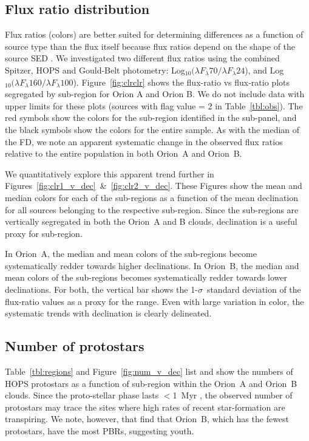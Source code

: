 \documentclass[manuscript]{aastex61}
\newcommand{\clra}{Log$_{10}(\lambda F_\lambda70/\lambda F_\lambda24$)}
\newcommand{\clrb}{Log$_{10}(\lambda F_\lambda160/\lambda F_\lambda100$)}
\begin{document}
\subsection{Flux ratio distribution}
\label{sec:fratio}
\par
Flux ratios (colors) are better suited for determining differences as a function of source type than the flux itself because flux ratios depend on the shape of the source SED \citep{ali}. We investigated two different flux ratios using the combined Spitzer, HOPS and Gould-Belt photometry: \clra, and \clrb. Figure~\ref{fig:clrclr} shows the flux-ratio vs flux-ratio plots segregated by sub-region for Orion A and Orion B. We do not include data with upper limits for these plots (sources with flag value = 2 in Table~\ref{tbl:obs}). The red symbols show the colors for the sub-region identified in the sub-panel, and the black symbols show the colors for the entire sample. As with the median of the FD, we note an apparent systematic change in the observed flux ratios relative to the entire population in both Orion~A and Orion~B.
\par
We quantitatively explore this apparent trend further in Figures~\ref{fig:clr1_v_dec}~\&~\ref{fig:clr2_v_dec}. These Figures show the mean and median colors for each of the sub-regions as a function of the mean declination for all sources belonging to the respective sub-region.  Since the sub-regions are vertically segregated in both the Orion~A and B clouds, declination is a useful proxy for sub-region.
\par
In Orion~A, the median and mean colors of the sub-regions become systematically redder towards higher declinations.  In Orion~B, the median and mean colors of the sub-regions becomes systematically redder towards lower declinations.  For both, the vertical bar shows the 1-$\sigma$\ standard deviation of the flux-ratio values as a proxy for the range.  Even with large variation in color, the systematic trends with declination is clearly delineated.

\subsection{Number of protostars}
\label{sec:numbers}
Table~\ref{tbl:regions} and Figure~\ref{fig:num_v_dec} list and show the numbers of HOPS protostars as a function of sub-region within the Orion~A and Orion~B clouds.  Since the proto-stellar phase lasts $<$1~Myr \citep{orion}, the observed number of protostars may trace the sites where high rates of recent star-formation are transpiring.  We note, however, that \citet{pbrpaper} find that Orion~B, which has the fewest protostars, have the most PBRs, suggesting youth.
\end{document}

